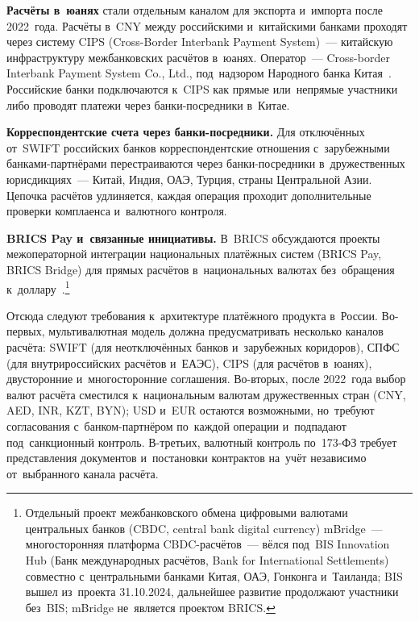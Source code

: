 \textbf{Расчёты в~юанях} стали отдельным каналом для экспорта и~импорта после
2022~года. Расчёты в~CNY между российскими и~китайскими банками проходят через
систему CIPS (Cross-Border Interbank Payment System)~---
китайскую инфраструктуру межбанковских расчётов в~юанях. Оператор~---
Cross-border Interbank Payment System Co., Ltd., под~надзором Народного банка
Китая~\cite{cips-overview}. Российские банки подключаются к~CIPS как прямые
или~непрямые участники либо проводят платежи через банки-посредники в~Китае.

\textbf{Корреспондентские счета через банки-посредники.} Для отключённых
от~SWIFT российских банков корреспондентские отношения с~зарубежными банками-партнёрами
перестраиваются через банки-посредники в~дружественных юрисдикциях~--- Китай,
Индия, ОАЭ, Турция, страны Центральной Азии. Цепочка расчётов удлиняется,
каждая операция проходит дополнительные проверки комплаенса и~валютного
контроля.

\textbf{BRICS Pay и~связанные инициативы.} В~BRICS обсуждаются проекты
межоператорной интеграции национальных платёжных систем (BRICS Pay, BRICS
Bridge) для прямых расчётов в~национальных валютах без~обращения
к~доллару~\cite{brics-pay-overview}.\footnote{Отдельный проект межбанковского
  обмена цифровыми валютами центральных банков (CBDC, central bank digital
  currency) mBridge~--- многосторонняя платформа CBDC-расчётов~--- вёлся под~BIS
  Innovation Hub (Банк международных расчётов, Bank for International
  Settlements) совместно с~центральными банками Китая, ОАЭ, Гонконга и~Таиланда;
  BIS вышел из~проекта 31.10.2024, дальнейшее развитие продолжают участники
без~BIS; mBridge не~является проектом BRICS.}

Отсюда следуют требования к~архитектуре платёжного продукта в~России.
Во-первых, мультивалютная модель должна предусматривать несколько
каналов расчёта: SWIFT (для неотключённых банков и~зарубежных коридоров),
СПФС (для внутрироссийских расчётов и~ЕАЭС), CIPS (для расчётов в~юанях),
двусторонние и~многосторонние соглашения. Во-вторых, после 2022~года выбор
валют расчёта сместился к~национальным валютам дружественных стран (CNY, AED,
INR, KZT, BYN); USD и~EUR остаются возможными, но~требуют согласования
с~банком-партнёром по~каждой
операции и~подпадают под~санкционный контроль. В-третьих, валютный контроль
по~173-ФЗ требует представления документов и~постановки контрактов на~учёт
независимо от~выбранного канала расчёта.



